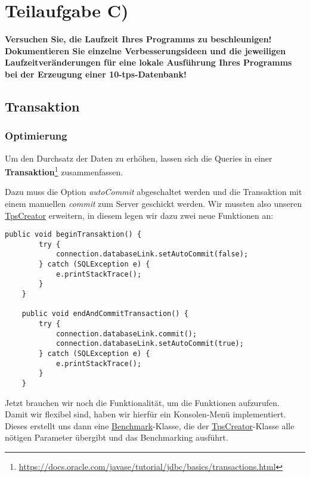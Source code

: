 \section{Teilaufgabe C)}
\textbf{Versuchen Sie, die Laufzeit Ihres Programms zu beschleunigen! Dokumentieren Sie
einzelne Verbesserungsideen und die jeweiligen Laufzeitveränderungen für eine lokale
Ausführung Ihres Programms bei der Erzeugung einer 10-tps-Datenbank!}

\subsection{Transaktion}
\subsubsection*{Optimierung}
Um den Durchsatz der Daten zu erhöhen, lassen sich die Queries in einer
\textbf{Transaktion}\footnote{\url{https://docs.oracle.com/javase/tutorial/jdbc/basics/transactions.html}} zusammenfassen.  

Dazu muss die Option \textit{autoCommit} abgeschaltet werden und die Transaktion
mit einem manuellen \textit{commit} zum Server geschickt werden. Wir mussten
also unseren \hyperref[lst:tpsv2]{TpsCreator} erweitern, in
diesem legen wir dazu zwei neue Funktionen an:

\begin{lstlisting}[caption={Erweiterung der TpsCreator-Klasse}]
	public void beginTransaktion() {
		try {
			connection.databaseLink.setAutoCommit(false);
		} catch (SQLException e) {
			e.printStackTrace();
		}
	}
	
	public void endAndCommitTransaction() {
		try {
			connection.databaseLink.commit();
			connection.databaseLink.setAutoCommit(true);
		} catch (SQLException e) {
			e.printStackTrace();
		}
	}
\end{lstlisting}

Jetzt brauchen wir noch die Funktionalität, um die Funktionen aufzurufen. Damit
wir flexibel sind, haben wir hierfür ein Konsolen-Menü implementiert.
Dieses erstellt uns dann eine  \hyperref[lst:bmv2]{Benchmark}-Klasse, die der
\hyperref[lst:tpsv2]{TpsCreator}-Klasse alle nötigen Parameter übergibt und das Benchmarking ausführt.

